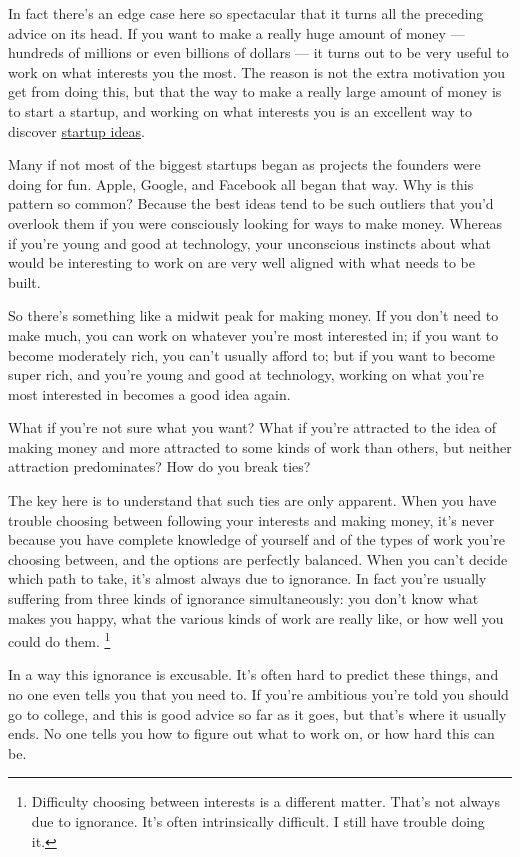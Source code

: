 In fact there's an edge case here so spectacular that it turns all the
preceding advice on its head. If you want to make a really huge amount
of money --- hundreds of millions or even billions of dollars --- it
turns out to be very useful to work on what interests you the most. The
reason is not the extra motivation you get from doing this, but that the
way to make a really large amount of money is to start a startup, and
working on what interests you is an excellent way to discover
\href{startupideas.html}{startup ideas}.

Many if not most of the biggest startups began as projects the founders
were doing for fun. Apple, Google, and Facebook all began that way. Why
is this pattern so common? Because the best ideas tend to be such
outliers that you'd overlook them if you were consciously looking for
ways to make money. Whereas if you're young and good at technology, your
unconscious instincts about what would be interesting to work on are
very well aligned with what needs to be built.

So there's something like a midwit peak for making money. If you don't
need to make much, you can work on whatever you're most interested in;
if you want to become moderately rich, you can't usually afford to; but
if you want to become super rich, and you're young and good at
technology, working on what you're most interested in becomes a good
idea again.

What if you're not sure what you want? What if you're attracted to the
idea of making money and more attracted to some kinds of work than
others, but neither attraction predominates? How do you break ties?

The key here is to understand that such ties are only apparent. When you
have trouble choosing between following your interests and making money,
it's never because you have complete knowledge of yourself and of the
types of work you're choosing between, and the options are perfectly
balanced. When you can't decide which path to take, it's almost always
due to ignorance. In fact you're usually suffering from three kinds of
ignorance simultaneously: you don't know what makes you happy, what the
various kinds of work are really like, or how well you could do them.
\footnote{Difficulty choosing between interests is a different matter.
That's not always due to ignorance. It's often intrinsically difficult.
I still have trouble doing it.}

In a way this ignorance is excusable. It's often hard to predict these
things, and no one even tells you that you need to. If you're ambitious
you're told you should go to college, and this is good advice so far as
it goes, but that's where it usually ends. No one tells you how to
figure out what to work on, or how hard this can be.

